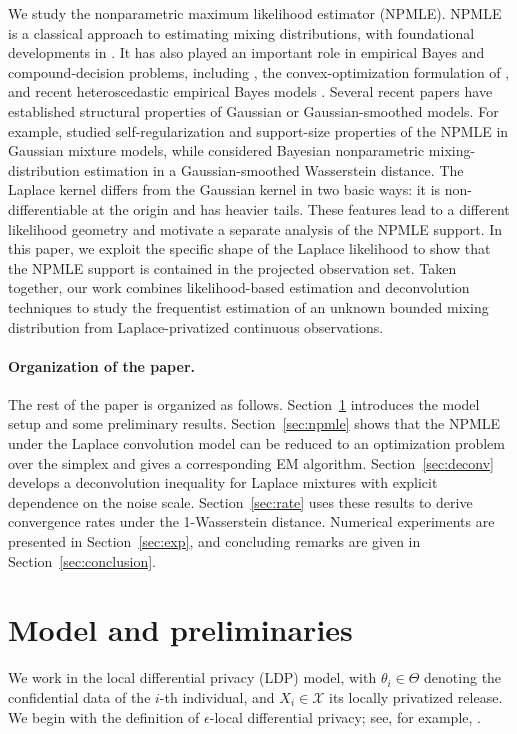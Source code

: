\documentclass[english, 11pt]{article}
\theoremstyle{plain}
\theoremstyle{definition}
\theoremstyle{remark}
\begin{document}
We study the nonparametric maximum likelihood estimator (NPMLE).
NPMLE is a classical approach to estimating mixing distributions, with foundational developments in \cite{laird1978nonparametric,lindsay1983geometry,lindsay1995mixture}.
It has also played an important role in empirical Bayes and compound-decision problems, including \cite{robbins1992empirical}, the convex-optimization formulation of \cite{koenker2014convex}, and recent heteroscedastic empirical Bayes models \citep{soloff2024multivariate}.
Several recent papers have established structural properties of Gaussian or Gaussian-smoothed models.
For example, \cite{polyanskiy2020self} studied self-regularization and support-size properties of the NPMLE in Gaussian mixture models, while \cite{scricciolo2026bayes} considered Bayesian nonparametric mixing-distribution estimation in a Gaussian-smoothed Wasserstein distance.
The Laplace kernel differs from the Gaussian kernel in two basic ways: it is non-differentiable at the origin and has heavier tails.
These features lead to a different likelihood geometry and motivate a separate analysis of the NPMLE support.
In this paper, we exploit the specific shape of the Laplace likelihood to show that the NPMLE support is contained in the projected observation set.
Taken together, our work combines likelihood-based estimation and deconvolution techniques to study the frequentist estimation of an unknown bounded mixing distribution from Laplace-privatized continuous observations.

\paragraph{Organization of the paper.}The rest of the paper is organized as follows. 
Section~\ref{sec:preliminaries} introduces the model setup and some preliminary results. 
Section~\ref{sec:npmle} shows that the NPMLE under the Laplace convolution model can be reduced to an optimization problem over the simplex and gives a corresponding EM algorithm. 
Section~\ref{sec:deconv} develops a deconvolution inequality for Laplace mixtures with explicit dependence on the noise scale. 
Section~\ref{sec:rate} uses these results to derive convergence rates under the 1-Wasserstein distance.
Numerical experiments are presented in Section~\ref{sec:exp}, and concluding remarks are given in Section~\ref{sec:conclusion}.

\section{Model and preliminaries}\label{sec:preliminaries}
We work in the local differential privacy (LDP) model, with $\theta_i \in \Theta$ denoting the confidential data of the $i$-th individual, and $X_i \in \mathcal X$ its locally privatized release.
We begin with the definition of $\epsilon$-local differential privacy; see, for example, \cite{duchi2013local,kairouz2016extremal}.
\end{document}
